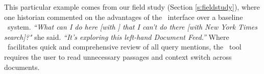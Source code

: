 This particular example comes from our field study (Section \ref{s:fieldstudy}), where one historian commented on the advantages of the \ours~interface over a baseline \Baselongname~system.
\textit{ ``What can I do here [with \ours] that I can't do there [with \textit{New York Times} search]?"} she said. 
\textit{``It's exploring this left-hand Document Feed.''}
Where \ours~facilitates quick and comprehensive review of all query mentions, the \Baselongname~tool requires the user to read unnecessary passages and context switch across documents.